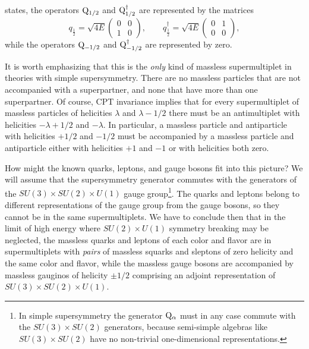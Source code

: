 states, the operators $\mathrm{Q}_{1/2}$ and $\mathrm{Q}^\dagger_{1/2}$ are
represented by the matrices
\begin{equation}
  q_{\frac12}=\sqrt{4E}
  \begin{pmatrix}
    0&0\\
    1&0
  \end{pmatrix},
  \qquad
  q^\dagger_{\frac12}=\sqrt{4E}
  \begin{pmatrix}
    0&1\\
    0&0
  \end{pmatrix},
  \tag{25.4.8}\label{eq:25.4.8}
\end{equation}
while the operators $\mathrm{Q}_{-1/2}$ and $\mathrm{Q}^\dagger_{-1/2}$ are
represented by zero.

It is worth emphasizing that this is the \emph{only} kind of massless
supermultiplet in theories with simple supersymmetry. There are no massless
particles that are not accompanied with a superpartner, and none that have
more than one superpartner. Of course, CPT invariance implies that for every
supermultiplet of massless particles of helicities $\lambda$ and
$\lambda-1/2$ there must be an antimultiplet with helicities
$-\lambda+1/2$ and $-\lambda$. In particular, a massless particle and
antiparticle with helicities $+1/2$ and $-1/2$ must be accompanied by a
massless particle and antiparticle either with helicities $+1$ and $-1$ or
with helicities both zero.

How might the known quarks, leptons, and gauge bosons fit into this picture?
We will assume that the supersymmetry generator commutes with the generators
of the $SU(3)\times SU(2)\times U(1)$ gauge group\footnote{In simple
supersymmetry the generator $\mathrm{Q}_\alpha$ must in any case commute with the
$SU(3)\times SU(2)$ generators, because semi-simple algebras like
$SU(3)\times SU(2)$ have no non-trivial one-dimensional representations.}.
The quarks and leptons belong to different representations of the gauge group
from the gauge bosons, so they cannot be in the same supermultiplets. We have
to conclude then that in the limit of high energy where $SU(2)\times U(1)$
symmetry breaking may be neglected, the massless quarks and leptons of each
color and flavor are in supermultiplets with \emph{pairs} of massless squarks
and sleptons of zero helicity and the same color and flavor, while the massless
gauge bosons are accompanied by massless gauginos of helicity $\pm1/2$
comprising an adjoint representation of $SU(3)\times SU(2)\times U(1)$.

